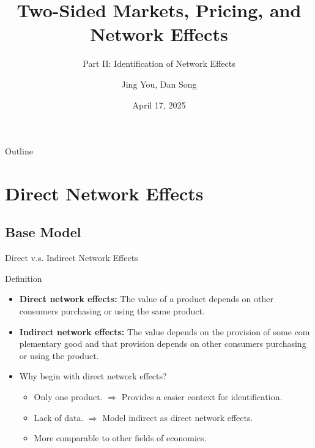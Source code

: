 \documentclass[aspectratio=169]{beamer}  %
\title{Two-Sided Markets, Pricing, and Network Effects}
\subtitle{Part II: Identification of Network Effects}
\author{Jing You, Dan Song}
\institute{Hong Kong University of Science and Technology}
\date{April 17, 2025}
\begin{document}
\begin{frame}
    \titlepage
\end{frame}

\begin{frame}{Outline}
    \tableofcontents
\end{frame}

\section{Direct Network Effects}
\subsection{Base Model}
\begin{frame}{Direct v.s. Indirect Network Effects}
    \begin{block}{Definition}
        \begin{itemize}
            \item \textbf{Direct network effects:} The value of a product depends on other consumers
            purchasing or using the same product.
            \item \textbf{Indirect network effects:} The value depends on the provision of some com
            plementary good and that provision depends on other consumers purchasing or using
            the product.
        \end{itemize}            
    \end{block}

    \begin{itemize}
        \item Why begin with direct network effects?
        \begin{itemize}
            \item Only one product. $\Rightarrow$ Provides a easier context for identification.
            \item Lack of data. $\Rightarrow$ Model indirect as direct network effects.
            \item More comparable to other fields of economics.
        \end{itemize}
    \end{itemize}
\end{frame}
\end{document}
